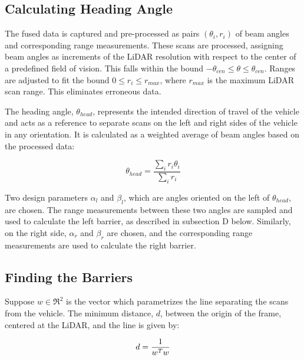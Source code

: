 \documentclass[conference]{IEEEtran}
\begin{document}
\subsection{Calculating Heading Angle}

The fused data is captured and pre-processed as pairs $(\theta_i, r_i)$ of beam angles and corresponding range measurements. These scans are processed, assigning beam angles as increments of the LiDAR resolution with respect to the center of a predefined field of vision. This falls within the bound $-\theta_{cen} \leq \theta \leq \theta_{cen}$.  Ranges are adjusted to fit the bound $0 \leq r_i \leq r_{max}$, where $r_{max}$ is the maximum LiDAR scan range. This eliminates erroneous data.

The heading angle, $\theta_{head}$, represents the intended direction of travel of the vehicle and acts as a reference to separate scans on the left and right sides of the vehicle in any orientation. It is calculated as a weighted average of beam angles based on the processed data:

\[\theta_{head} = \frac{\sum_{i} r_i \theta_i}{\sum_{i} r_i} \]

Two design parameters $\alpha_l$ and $\beta_l$, which are angles oriented on the left of $\theta_{head}$, are chosen.  The range measurements between these two angles are sampled and used to calculate the left barrier, as described in subsection D below. Similarly, on the right side, $\alpha_r$ and $\beta_r$ are chosen, and the corresponding range measurements are used to calculate the right barrier. 


\subsection{Finding the Barriers}
Suppose $w \in \Re^2$  is the vector which parametrizes the line separating the scans from the vehicle. The minimum distance, $d$, between the origin of the frame, centered at the LiDAR, and the line is given by:

\begin{align}
    d = \frac{1}{w^T w} \notag
\end{align}
\end{document}
